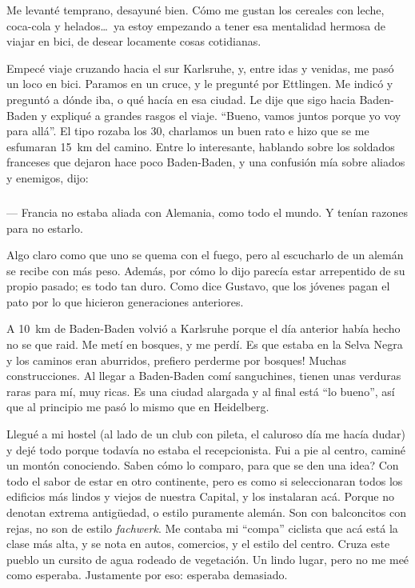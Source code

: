 Me levant\'e temprano, desayun\'e bien. C\'omo me gustan los cereales con
leche, coca-cola y helados\ldots\ ya estoy empezando a tener esa mentalidad
hermosa de viajar en bici, de desear locamente cosas cotidianas.

Empec\'e viaje cruzando hacia el sur Karlsruhe, y, entre idas y venidas, me
pas\'o un loco en bici. Paramos en un cruce, y le pregunt\'e por Ettlingen. Me
indic\'o y pregunt\'o a d\'onde iba, o qu\'e hac\'ia en esa ciudad. Le dije
que sigo hacia Baden-Baden y expliqu\'e a grandes rasgos el viaje. ``Bueno,
vamos juntos porque yo voy para all\'a''. El tipo rozaba los 30, charlamos un
buen rato e hizo que se me esfumaran 15~km del camino. Entre lo interesante,
hablando sobre los soldados franceses que dejaron hace poco Baden-Baden, y una
confusi\'on m\'ia sobre aliados y enemigos, dijo:

\subparagraph{}\label{ssub:FranciaAliada} --- Francia no estaba aliada con
Alemania, como todo el mundo. Y ten\'ian razones para no estarlo.\\
\hangindent=1cm

Algo claro como que uno se quema con el fuego, pero al escucharlo de un
alem\'an se recibe con m\'as peso. Adem\'as, por c\'omo lo dijo parec\'ia
estar arrepentido de su propio pasado; es todo tan duro. Como dice Gustavo,
que los j\'ovenes pagan el pato por lo que hicieron generaciones anteriores.

A 10~km de Baden-Baden volvi\'o a Karlsruhe porque el d\'ia anterior hab\'ia
hecho no se que raid. Me met\'i en bosques, y me perd\'i. Es que estaba en la
Selva Negra y los caminos eran aburridos, \textexclamdown prefiero perderme
por bosques! Muchas construcciones. Al llegar a Baden-Baden com\'i
sanguchines, tienen unas verduras raras para m\'i, muy ricas. Es una ciudad
alargada y al final est\'a ``lo bueno'', as\'i que al principio me pas\'o lo
mismo que en Heidelberg.

Llegu\'e a mi hostel (al lado de un club con pileta, el caluroso d\'ia me
hac\'ia dudar) y dej\'e todo porque todav\'ia no estaba el recepcionista. Fui
a pie al centro, camin\'e un mont\'on conociendo. \textquestiondown Saben
c\'omo lo comparo, para que se den una idea? Con todo el sabor de estar en
otro continente, pero es como si seleccionaran todos los edificios m\'as
lindos y viejos de nuestra Capital, y los instalaran ac\'a. Porque no denotan
extrema antig\"uedad, o estilo puramente alem\'an. Son con balconcitos con
rejas, no son de estilo \emph{fachwerk}. Me contaba mi ``compa'' ciclista que
ac\'a est\'a la clase m\'as alta, y se nota en autos, comercios, y el estilo del
centro. Cruza este pueblo un cursito de agua rodeado de vegetaci\'on. Un lindo
lugar, pero no me me\'e como esperaba. Justamente por eso: esperaba demasiado.

